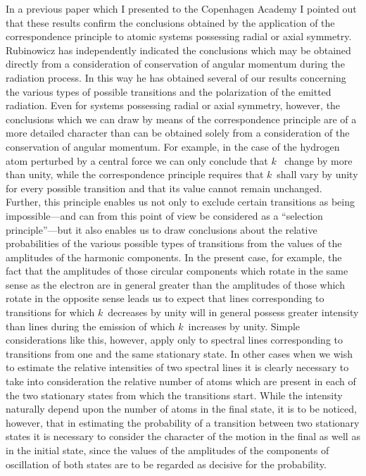 In a previous paper which I presented to the Copenhagen
Academy I pointed out that these results confirm the conclusions
obtained by the application of the correspondence principle to
atomic systems possessing radial or axial symmetry. Rubinowicz
has independently indicated the conclusions which may be obtained
directly from a consideration of conservation of angular momentum
during the radiation process. In this way he has obtained several
of our results concerning the various types of possible transitions
and the polarization of the emitted radiation. Even for systems
possessing radial or axial symmetry, however, the conclusions which
we can draw by means of the correspondence principle are of a
more detailed character than can be obtained solely from a consideration
of the conservation of angular momentum. For example,
in the case of the hydrogen atom perturbed by a central force we
can only conclude that $k$~ change by more than unity, while
the correspondence principle requires that $k$~shall vary by unity
for every possible transition and that its value cannot remain unchanged.
Further, this principle enables us not only to exclude
certain transitions as being impossible---and can from this point of
view be considered as a ``selection principle''---but it also enables
us to draw conclusions about the relative probabilities of the various
possible types of transitions from the values of the amplitudes of
the harmonic components. In the present case, for example, the
fact that the amplitudes of those circular components which rotate
in the same sense as the electron are in general greater than the
amplitudes of those which rotate in the opposite sense leads us to
expect that lines corresponding to transitions for which $k$~decreases
by unity will in general possess greater intensity than lines during
the emission of which $k$~increases by unity. Simple considerations
like this, however, apply only to spectral lines corresponding to
transitions from one and the same stationary state. In other
cases when we wish to estimate the relative intensities of two
spectral lines it is clearly necessary to take into consideration the
relative number of atoms which are present in each of the two
stationary states from which the transitions start. While the intensity
naturally  depend upon the number of atoms in the
final state, it is to be noticed, however, that in estimating the
probability of a transition between two stationary states it is necessary
to consider the character of the motion in the final as well as
in the initial state, since the values of the amplitudes of the components
of oscillation of both states are to be regarded as decisive
for the probability.

